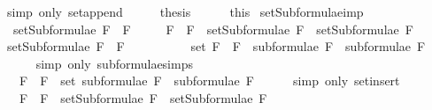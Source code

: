 \begin{isabellebody}
\ {\isacharparenleft}simp\ only{\isacharcolon}\ set{\isacharunderscore}append{\isacharparenright}\isanewline
\ \ \isamarkupfalse%
\ \isamarkupfalse%
\ {\isacharquery}thesis\isanewline
\ \ \ \ \isamarkupfalse%
\ this\isanewline
{}\isamarkupfalse%
%
\endisatagproof
{\isafoldproof}%
%
\isadelimproof
\isanewline
%
\endisadelimproof
\isanewline
{}\isamarkupfalse%
\ setSubformulae{\isacharunderscore}imp{\isacharcolon}\ \isanewline
\ \ {\isachardoublequoteopen}setSubformulae\ {\isacharparenleft}F{}\ \isactrlbold {\isasymrightarrow}\ F{}{\isacharparenright}\ \isanewline
\ \ \ {\isacharequal}\ {\isacharbraceleft}F{}\ \isactrlbold {\isasymrightarrow}\ F{}{\isacharbraceright}\ {\isasymunion}\ {\isacharparenleft}setSubformulae\ F{}\ {\isasymunion}\ setSubformulae\ F{}{\isacharparenright}{\isachardoublequoteclose}\isanewline
%
\isadelimproof
%
\endisadelimproof
%
\isatagproof
{}\isamarkupfalse%
\ {\isacharminus}\isanewline
\ \ \isamarkupfalse%
\ {\isachardoublequoteopen}setSubformulae\ {\isacharparenleft}F{}\ \isactrlbold {\isasymrightarrow}\ F{}{\isacharparenright}\ \isanewline
\ \ \ \ \ \ \ \ {\isacharequal}\ set\ {\isacharparenleft}{\isacharparenleft}F{}\ \isactrlbold {\isasymrightarrow}\ F{}{\isacharparenright}\ {\isacharhash}\ {\isacharparenleft}subformulae\ F{}\ {\isacharat}\ subformulae\ F{}{\isacharparenright}{\isacharparenright}{\isachardoublequoteclose}\isanewline
\ \ \ \ \isamarkupfalse%
\ {\isacharparenleft}simp\ only{\isacharcolon}\ subformulae{\isachardot}simps{\isacharparenleft}{}{\isacharparenright}{\isacharparenright}\isanewline
\ \ \isamarkupfalse%
\ \isamarkupfalse%
\ {\isachardoublequoteopen}{\isasymdots}\ {\isacharequal}\ {\isacharbraceleft}F{}\ \isactrlbold {\isasymrightarrow}\ F{}{\isacharbraceright}\ {\isasymunion}\ {\isacharparenleft}set\ {\isacharparenleft}subformulae\ F{}\ {\isacharat}\ subformulae\ F{}{\isacharparenright}{\isacharparenright}{\isachardoublequoteclose}\isanewline
\ \ \ \ \isamarkupfalse%
\ {\isacharparenleft}simp\ only{\isacharcolon}\ set{\isacharunderscore}insert{\isacharparenright}\isanewline
\ \ \isamarkupfalse%
\ \isamarkupfalse%
\ {\isachardoublequoteopen}{\isasymdots}\ {\isacharequal}\ {\isacharbraceleft}F{}\ \isactrlbold {\isasymrightarrow}\ F{}{\isacharbraceright}\ {\isasymunion}\ {\isacharparenleft}setSubformulae\ F{}\ {\isasymunion}\ setSubformulae\ F{}{\isacharparenright}{\isachardoublequoteclose}\isanewline

\end{isabellebody}
